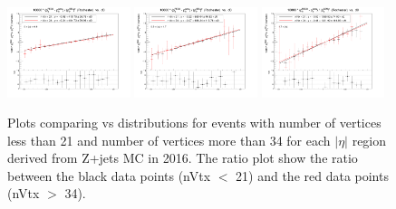 \begin{figure}[h!]
    \centering
    \includegraphics[width=0.32\textwidth]{images_geofit/nVtx_eta_0_0p9_2016.png}
    \includegraphics[width=0.32\textwidth]{images_geofit/nVtx_eta_0p9_1p7_2016.png}
    \includegraphics[width=0.32\textwidth]{images_geofit/nVtx_eta_1p7_inf_2016.png}
    \caption{Plots comparing \dptoverptsquare vs \dzeroBS distributions for events with number of vertices less than 21 and number of vertices more than 34 for each $|\eta|$ region derived from Z+jets MC in 2016. The ratio plot show the ratio between the black data points (nVtx $<$ 21) and the red data points (nVtx $>$ 34).}
    \label{fig:nVtx_d0_2016}
\end{figure}

